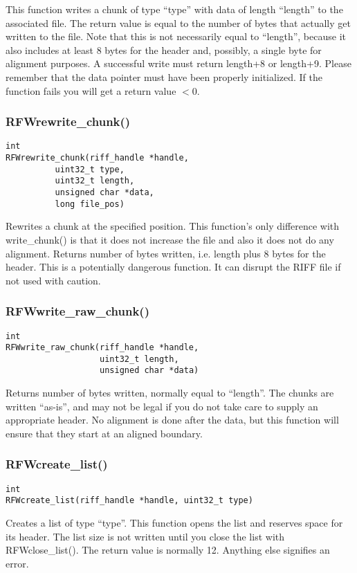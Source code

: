 \documentclass[12pt, a4paper]{article}
\begin{document}
This function writes a chunk of type ``type'' with data of length ``length'' to
the associated file. The return value is equal to the number of bytes that actually
get written to the file. Note that this is not necessarily equal to ``length'', 
because it also includes at least 8 bytes for the header and, possibly, a single
byte for alignment purposes. A successful write must return length+8 or length+9.
Please remember that the data pointer must have been properly initialized.
If the function fails you will get a return value $<0$.

\subsubsection{RFWrewrite\_chunk()}
\begin{verbatim}
int
RFWrewrite_chunk(riff_handle *handle, 
	      uint32_t type, 
	      uint32_t length, 
	      unsigned char *data,
	      long file_pos)
\end{verbatim}
Rewrites a chunk at the specified position. This function's only difference with 
write\_chunk() is that it does not increase the file and 
also it does not do any alignment.
Returns number of bytes written, i.e. length plus 8 bytes for the header.
This is a potentially dangerous function. It can disrupt the RIFF file if 
not used with caution.

\subsubsection{RFWwrite\_raw\_chunk()}
\begin{verbatim}
int
RFWwrite_raw_chunk(riff_handle *handle, 
                   uint32_t length, 
                   unsigned char *data)
\end{verbatim}
Returns number of bytes written, normally equal to ``length''.
The chunks are written ``as-is'', and may not be legal if you do
not take care to supply an appropriate header. No alignment is done 
after the data, but this function will ensure that they start at an
aligned boundary. 

\subsubsection{RFWcreate\_list()}
\begin{verbatim}
int
RFWcreate_list(riff_handle *handle, uint32_t type)
\end{verbatim}
Creates a list of type ``type''. This function opens the list and reserves
space for its header. The list size is not written until you close the 
list with RFWclose\_list(). The return value is normally 12. Anything else
signifies an error.
\end{document}
